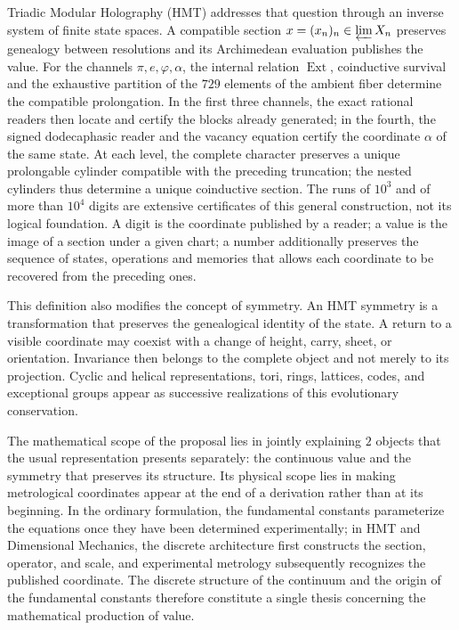 Triadic Modular Holography (HMT) addresses that question through an inverse
system of finite state spaces. A compatible section
\(x=(x_n)_n\in\varprojlim X_n\) preserves genealogy between resolutions and
its Archimedean evaluation publishes the value. For the channels
\(\pi,e,\varphi,\alpha\), the internal relation
\(\operatorname{Ext}\), coinductive survival and the exhaustive partition
of the \(729\) elements of the ambient fiber determine the compatible
prolongation. In the first three channels, the exact rational readers
then locate and certify the blocks already generated; in the fourth, the
signed dodecaphasic reader and the vacancy equation certify the coordinate
\(\alpha\) of the same state. At each level, the complete character preserves a
unique prolongable cylinder compatible with the preceding truncation; the nested
cylinders thus determine a unique coinductive section. The runs of
\(10^3\) and of more than \(10^4\) digits are extensive certificates of this
general construction, not its logical foundation. A digit is the
coordinate published by a reader; a value is the image of a section under
a given chart; a number additionally preserves the sequence of states,
operations and memories that allows each coordinate to be recovered from the
preceding ones.

This definition also modifies the concept of symmetry. An HMT symmetry
is a transformation that preserves the genealogical identity of the state. A
return to a visible coordinate may coexist with a change of height,
carry, sheet, or orientation. Invariance then belongs to the complete object
and not merely to its projection. Cyclic and helical representations,
tori, rings,
lattices, codes, and exceptional groups appear as successive realizations
of this evolutionary conservation.

The mathematical scope of the proposal lies in jointly explaining \(2\) objects that the usual representation presents separately: the continuous value and the symmetry that preserves its structure. Its physical scope lies in making metrological coordinates appear at the end of a derivation rather than at its beginning. In the ordinary formulation, the fundamental constants parameterize the equations once they have been determined experimentally; in HMT and Dimensional Mechanics, the discrete architecture first constructs the section, operator, and scale, and experimental metrology subsequently recognizes the published coordinate. The discrete structure of the continuum and the origin of the fundamental constants therefore constitute a single thesis concerning the mathematical production of value.

